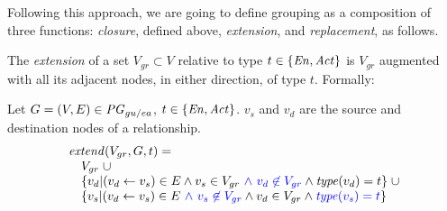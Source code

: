 Following this approach, we are going to define grouping as a composition of three functions: \textit{closure}, defined above, \textit{extension}, and \textit{replacement}, as follows.

%
The \textit{extension} of a set $V_{gr} \subset V$ relative to type $t \in \{ \mathit{En}, \mathit{Act} \}$ is $V_{gr}$ augmented with all its adjacent nodes, in either direction, of type $t$. Formally:





\vspace*{10pt}
\begin{definition}[$\extend$]
  \label{def:extend}
Let $G = (V,E) \in \mathit{PG}_{gu/ea}$, $t \in \{ \mathit{En}, \mathit{Act} \}$. $v_s$ and $v_d$ are the source and destination nodes of a relationship. 
\[
\begin{array}{l}
\extend(V_{gr}, G ,t) =  \\
\quad V_{gr} \;\cup \\ 
\quad    \{ v_d | (v_d \leftarrow v_s) \in E \wedge v_s \in V_{gr} \jwb{~\wedge\ v_d \nin V_{gr}} \wedge \type(v_d) = t \} \;\cup \\
\quad   \{ v_s | (v_d \leftarrow v_s) \in E  \jwb{~\wedge\ v_s \nin V_{gr}} \wedge v_d \in V_{gr}  \wedge \jwb{\type(v_s) = t} \}  \\
\end{array}
\]


\end{definition}

